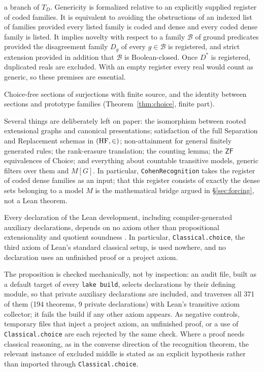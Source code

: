 \begin{description}[leftmargin=1.2em, itemsep=2pt]
a branch of $T_D$. Genericity is formalized relative to an explicitly supplied register of coded
families. It is equivalent to avoiding the obstructions of an indexed list of families provided
every listed family is coded and dense and every coded dense family is listed. It implies novelty
with respect to a family $\mathcal B$ of ground predicates provided the disagreement family $D_g$ of
every $g\in\mathcal B$ is registered, and strict extension provided in addition that $\mathcal B$ is
Boolean-closed. Once $D^\ast$ is registered, duplicated reals are excluded. With an empty register
every real would count as generic, so these premises are essential.
\item[\texttt{LiftChoice}.] Choice-free sections of surjections with finite source, and the
identity between sections and prototype families (Theorem~\ref{thm:choice}, finite part).
\end{description}

Several things are deliberately left on paper: the isomorphism between rooted extensional graphs
and canonical presentations; satisfaction of the full Separation and Replacement schemas in
$(\mathrm{HF},\in)$; non-attainment for general finitely generated rules; the rank-erasure translation;
the counting lemma; the $\mathsf{ZF}$ equivalences of Choice; and everything about countable
transitive models, generic filters over them and $M[G]$. In particular, \texttt{CohenRecognition}
takes the register of coded dense families as an input; that this register consists of exactly
the dense sets belonging to a model $M$ is the mathematical bridge argued in \S\ref{sec:forcing},
not a Lean theorem.

\begin{proposition}\label{prop:axioms}
Every declaration of the Lean development, including compiler-generated auxiliary declarations,
depends on no axiom other than propositional extensionality and quotient soundness
\citep{Carneiro2019}. In particular, \texttt{Classical.choice}, the third axiom of Lean's standard
classical setup, is used nowhere, and no declaration uses an unfinished proof or a project axiom.
\end{proposition}

The proposition is checked mechanically, not by inspection: an audit file, built as a default
target of every \texttt{lake build}, selects declarations by their defining module, so that private auxiliary declarations are
included, and traverses all 371 of them (194 theorems, 9 private declarations) with Lean's
transitive axiom collector; it fails the build if any other axiom appears. As negative controls,
temporary files that inject a project axiom, an unfinished proof, or a use of
\texttt{Classical.choice} are each rejected by the same check. Where a proof needs classical reasoning, as in the
converse direction of the recognition theorem, the relevant instance of excluded middle is stated
as an explicit hypothesis rather than imported through \texttt{Classical.choice}.

